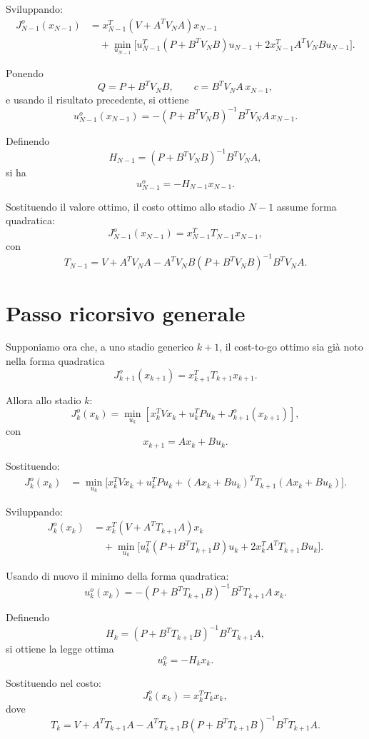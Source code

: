 Sviluppando:
\[
\begin{aligned}
J_{N-1}^o(x_{N-1})
&=
x_{N-1}^T(V+A^TV_NA)x_{N-1}\\
&\quad+
\min_{u_{N-1}}
\Big[
u_{N-1}^T(P+B^TV_NB)u_{N-1}
+
2x_{N-1}^T A^TV_NBu_{N-1}
\Big].
\end{aligned}
\]

Ponendo
\[
Q=P+B^TV_NB,
\qquad
c=B^TV_NA\,x_{N-1},
\]
e usando il risultato precedente, si ottiene
\[
u_{N-1}^o(x_{N-1})
=
-(P+B^TV_NB)^{-1}B^TV_NA\,x_{N-1}.
\]

Definendo
\[
H_{N-1}
=
(P+B^TV_NB)^{-1}B^TV_NA,
\]
si ha
\[
u_{N-1}^o=-H_{N-1}x_{N-1}.
\]

Sostituendo il valore ottimo, il costo ottimo allo stadio \(N-1\) assume forma quadratica:
\[
J_{N-1}^o(x_{N-1})=x_{N-1}^T T_{N-1}x_{N-1},
\]
con
\[
T_{N-1}
=
V+A^TV_NA
-
A^TV_NB(P+B^TV_NB)^{-1}B^TV_NA.
\]

\section{Passo ricorsivo generale}

Supponiamo ora che, a uno stadio generico \(k+1\), il cost-to-go ottimo sia già noto
nella forma quadratica
\[
J_{k+1}^o(x_{k+1})=x_{k+1}^T T_{k+1}x_{k+1}.
\]

Allora allo stadio \(k\):
\[
J_k^o(x_k)
=
\min_{u_k}
\left[
x_k^TVx_k+u_k^TPu_k+J_{k+1}^o(x_{k+1})
\right],
\]
con
\[
x_{k+1}=Ax_k+Bu_k.
\]

Sostituendo:
\[
\begin{aligned}
J_k^o(x_k)
&=
\min_{u_k}
\Big[
x_k^TVx_k
+
u_k^TPu_k
+
(Ax_k+Bu_k)^TT_{k+1}(Ax_k+Bu_k)
\Big].
\end{aligned}
\]

Sviluppando:
\[
\begin{aligned}
J_k^o(x_k)
&=
x_k^T(V+A^TT_{k+1}A)x_k\\
&\quad+
\min_{u_k}
\Big[
u_k^T(P+B^TT_{k+1}B)u_k
+
2x_k^TA^TT_{k+1}Bu_k
\Big].
\end{aligned}
\]

Usando di nuovo il minimo della forma quadratica:
\[
u_k^o(x_k)
=
-(P+B^TT_{k+1}B)^{-1}B^TT_{k+1}A\,x_k.
\]

Definendo
\[
H_k
=
(P+B^TT_{k+1}B)^{-1}B^TT_{k+1}A,
\]
si ottiene la legge ottima
\[
u_k^o=-H_kx_k.
\]

Sostituendo nel costo:
\[
J_k^o(x_k)=x_k^TT_kx_k,
\]
dove
\[
T_k
=
V
+
A^TT_{k+1}A
-
A^TT_{k+1}B
(P+B^TT_{k+1}B)^{-1}
B^TT_{k+1}A.
\]

